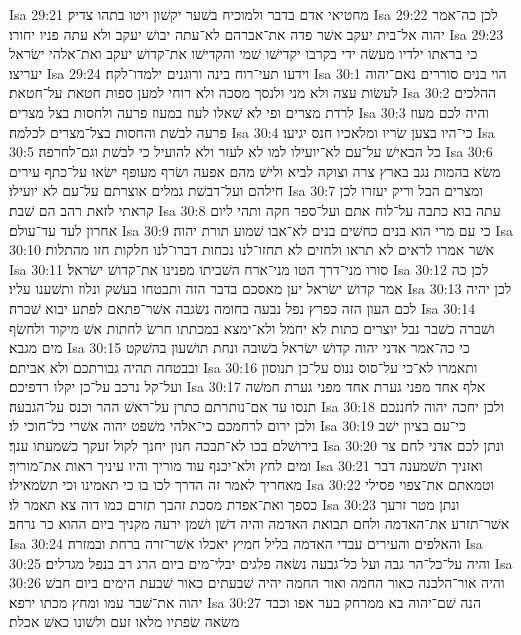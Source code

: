 Isa 29:21  מחטיאי אדם בדבר ולמוכיח בשׁער יקשׁון ויטו בתהו צדיק׃
Isa 29:22  לכן כה־אמר יהוה אל־בית יעקב אשׁר פדה את־אברהם לא־עתה יבושׁ יעקב ולא עתה פניו יחורו׃
Isa 29:23  כי בראתו ילדיו מעשׂה ידי בקרבו יקדישׁו שׁמי והקדישׁו את־קדושׁ יעקב ואת־אלהי ישׂראל יעריצו׃
Isa 29:24  וידעו תעי־רוח בינה ורוגנים ילמדו־לקח׃
Isa 30:1  הוי בנים סוררים נאם־יהוה לעשׂות עצה ולא מני ולנסך מסכה ולא רוחי למען ספות חטאת על־חטאת׃
Isa 30:2  ההלכים לרדת מצרים ופי לא שׁאלו לעוז במעוז פרעה ולחסות בצל מצרים׃
Isa 30:3  והיה לכם מעוז פרעה לבשׁת והחסות בצל־מצרים לכלמה׃
Isa 30:4  כי־היו בצען שׂריו ומלאכיו חנס יגיעו׃
Isa 30:5  כל הבאישׁ על־עם לא־יועילו למו לא לעזר ולא להועיל כי לבשׁת וגם־לחרפה׃
Isa 30:6  משׂא בהמות נגב בארץ צרה וצוקה לביא ולישׁ מהם אפעה ושׂרף מעופף ישׂאו על־כתף עירים חילהם ועל־דבשׁת גמלים אוצרתם על־עם לא יועילו׃
Isa 30:7  ומצרים הבל וריק יעזרו לכן קראתי לזאת רהב הם שׁבת׃
Isa 30:8  עתה בוא כתבה על־לוח אתם ועל־ספר חקה ותהי ליום אחרון לעד עד־עולם׃
Isa 30:9  כי עם מרי הוא בנים כחשׁים בנים לא־אבו שׁמוע תורת יהוה׃
Isa 30:10  אשׁר אמרו לראים לא תראו ולחזים לא תחזו־לנו נכחות דברו־לנו חלקות חזו מהתלות׃
Isa 30:11  סורו מני־דרך הטו מני־ארח השׁביתו מפנינו את־קדושׁ ישׂראל׃
Isa 30:12  לכן כה אמר קדושׁ ישׂראל יען מאסכם בדבר הזה ותבטחו בעשׁק ונלוז ותשׁענו עליו׃
Isa 30:13  לכן יהיה לכם העון הזה כפרץ נפל נבעה בחומה נשׂגבה אשׁר־פתאם לפתע יבוא שׁברה׃
Isa 30:14  ושׁברה כשׁבר נבל יוצרים כתות לא יחמל ולא־ימצא במכתתו חרשׂ לחתות אשׁ מיקוד ולחשׂף מים מגבא׃
Isa 30:15  כי כה־אמר אדני יהוה קדושׁ ישׂראל בשׁובה ונחת תושׁעון בהשׁקט ובבטחה תהיה גבורתכם ולא אביתם׃
Isa 30:16  ותאמרו לא־כי על־סוס ננוס על־כן תנוסון ועל־קל נרכב על־כן יקלו רדפיכם׃
Isa 30:17  אלף אחד מפני גערת אחד מפני גערת חמשׁה תנסו עד אם־נותרתם כתרן על־ראשׁ ההר וכנס על־הגבעה׃
Isa 30:18  ולכן יחכה יהוה לחננכם ולכן ירום לרחמכם כי־אלהי משׁפט יהוה אשׁרי כל־חוכי לו׃
Isa 30:19  כי־עם בציון ישׁב בירושׁלם בכו לא־תבכה חנון יחנך לקול זעקך כשׁמעתו ענך׃
Isa 30:20  ונתן לכם אדני לחם צר ומים לחץ ולא־יכנף עוד מוריך והיו עיניך ראות את־מוריך׃
Isa 30:21  ואזניך תשׁמענה דבר מאחריך לאמר זה הדרך לכו בו כי תאמינו וכי תשׂמאילו׃
Isa 30:22  וטמאתם את־צפוי פסילי כספך ואת־אפדת מסכת זהבך תזרם כמו דוה צא תאמר לו׃
Isa 30:23  ונתן מטר זרעך אשׁר־תזרע את־האדמה ולחם תבואת האדמה והיה דשׁן ושׁמן ירעה מקניך ביום ההוא כר נרחב׃
Isa 30:24  והאלפים והעירים עבדי האדמה בליל חמיץ יאכלו אשׁר־זרה ברחת ובמזרה׃
Isa 30:25  והיה על־כל־הר גבה ועל כל־גבעה נשׂאה פלגים יבלי־מים ביום הרג רב בנפל מגדלים׃
Isa 30:26  והיה אור־הלבנה כאור החמה ואור החמה יהיה שׁבעתים כאור שׁבעת הימים ביום חבשׁ יהוה את־שׁבר עמו ומחץ מכתו ירפא׃
Isa 30:27  הנה שׁם־יהוה בא ממרחק בער אפו וכבד משׂאה שׂפתיו מלאו זעם ולשׁונו כאשׁ אכלת׃
